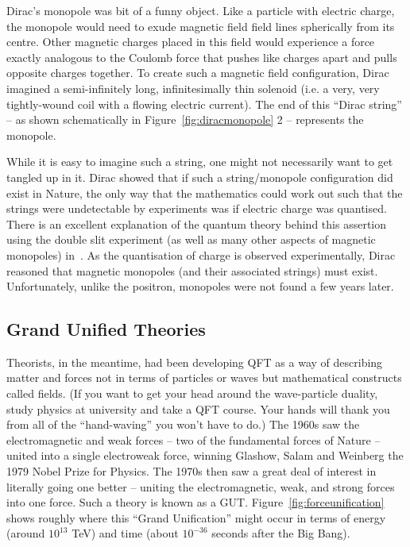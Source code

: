 Dirac's monopole was bit of a funny object.
Like a particle with electric charge,
the monopole would need to exude magnetic field field lines spherically
from its centre. Other magnetic charges placed in this field would experience
a force exactly analogous to the Coulomb force that pushes like charges apart
and pulls opposite charges together.
To create such a magnetic field configuration,
Dirac imagined a semi-infinitely long, infinitesimally thin solenoid
(i.e. a very, very tightly-wound coil with a flowing electric current).
%
The end of this ``Dirac string'' -- as shown schematically in
Figure~\ref{fig:diracmonopole} 2 -- represents the monopole.

While it is easy to imagine such a string,
one might not necessarily want to get tangled up in it.
Dirac showed that if such a string/monopole configuration did exist in
Nature, the only way that the mathematics could work out such that the
strings were undetectable by experiments was if electric charge was quantised.
There is an excellent explanation of the quantum theory behind this assertion
using the double slit experiment (as well as many other aspects of magnetic
monopoles) in~\cite{Rajantie2012}.
%
As the quantisation of charge is observed experimentally,
Dirac reasoned that magnetic monopoles (and their associated strings)
must exist.
%
Unfortunately, unlike the positron, monopoles were not found a few years
later.

\subsection{Grand Unified Theories}
\label{sec:guts}
Theorists, in the meantime, had been developing \ac{QFT}
as a way of describing matter and forces not in terms of particles or waves 
but mathematical constructs called fields.
%
(If you want to get your head around the wave-particle duality,
study physics at university and take a \ac{QFT} course.
Your hands will thank you from all of the ``hand-waving'' you won’t have to do.)
%
The 1960s saw the electromagnetic and weak forces -- two of the fundamental
forces of Nature -- united into a single electroweak force,
winning Glashow, Salam and Weinberg the 1979 Nobel Prize for
Physics.
The 1970s then saw a great deal of interest in literally going one
better -- uniting the electromagnetic, weak, and strong forces into one force.
Such a theory is known as a \ac{GUT}. %
Figure~\ref{fig:forceunification} shows roughly where this ``Grand Unification''
might occur in terms of energy (around $10^{13}$ \ac{TeV}) and time
(about $10^{-36}$ seconds after the Big Bang).

